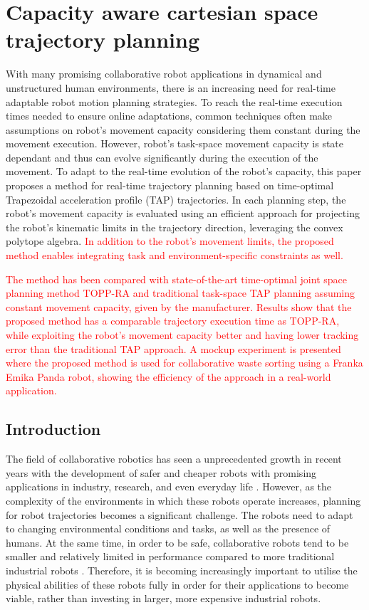 
\chapter{Capacity aware cartesian space trajectory planning}

\newcommand{\DD}[1]{\textcolor{teal}{[dd] #1}}
\newcommand{\redo}[1]{\todo[inline]{[redo] #1}}

With many promising collaborative robot applications in dynamical and unstructured human environments, there is an increasing need for real-time adaptable robot motion planning strategies. To reach the real-time execution times needed to ensure online adaptations, common techniques often make assumptions on robot's movement capacity considering them constant during the movement execution. However, robot's task-space movement capacity is state dependant and thus can evolve significantly during the execution of the movement.
To adapt to the real-time evolution of the robot's capacity, this paper proposes a method for real-time trajectory planning based on time-optimal Trapezoidal acceleration profile (TAP) trajectories. 
In each planning step, the robot's movement capacity is evaluated using an efficient approach for projecting the robot's kinematic limits in the trajectory direction, leveraging the convex polytope algebra.
\textcolor{red}{In addition to the robot's movement limits, the proposed method enables integrating task and environment-specific constraints as well.}

\textcolor{red}{
The method has been compared with state-of-the-art time-optimal joint space planning method TOPP-RA and traditional task-space TAP planning assuming constant movement capacity, given by the manufacturer. Results show that the proposed method has a comparable trajectory execution time as TOPP-RA, while exploiting the robot's movement capacity better and having lower tracking error than the traditional TAP approach. A mockup experiment is presented where the proposed method is used for collaborative waste sorting using a Franka Emika Panda robot, showing the efficiency of the approach in a real-world application.}

\section{Introduction}

The field of collaborative robotics has seen a unprecedented growth in recent years with the development of safer and cheaper robots with promising applications in industry, research, and even everyday life \cite{ajoudani2018progress}. However, as the complexity of the environments in which these robots operate increases, planning for robot trajectories becomes a significant challenge.  The robots need to adapt to changing environmental conditions and tasks, as well as the presence of humans. 
At the same time, in order to be safe, collaborative robots tend to be smaller and relatively limited in performance compared to more traditional industrial robots \cite{smu}. Therefore, it is becoming increasingly important to utilise the physical abilities of these robots fully in order for their applications to become viable, rather than investing in larger, more expensive industrial robots. 

